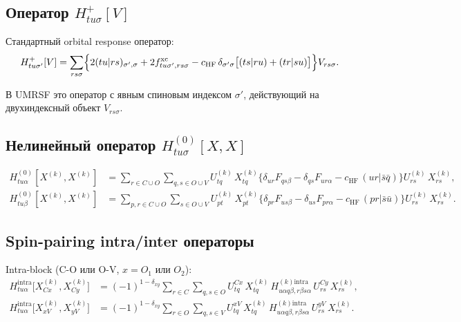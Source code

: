 \documentclass[11pt, a4paper]{article}
\theoremstyle{definition}
\newcommand{\Uk}[2]{U^{(#1)}_{#2}}
\newcommand{\Xk}[2]{X^{(#1)}_{#2}}
\newcommand{\Hp}{H^{+}}
\newcommand{\Hintra}{H^{\text{intra}}}
\newcommand{\Hkintra}{H^{(k)\text{intra}}}
\newcommand{\HF}{\text{HF}}
\newcommand{\xc}{\text{xc}}
\begin{document}
\subsection{Оператор $H^+_{tu\sigma}[V]$}

Стандартный orbital response оператор:
\begin{equation}
    \Hp_{tu\sigma'}[V] = \sum_{rs\sigma}\Bigl\{ 2(tu|rs)_{\sigma', \sigma} + 2 f^{\xc}_{tu\sigma', rs\sigma} - c_{\HF}\, \delta_{\sigma'\sigma}\bigl[(ts|ru) + (tr|su)\bigr] \Bigr\} V_{rs\sigma}.
    \label{eq:Hplus}
\end{equation}

В UMRSF это оператор с явным спиновым индексом $\sigma'$, действующий на двухиндексный объект $V_{rs\sigma}$.

\subsection{Нелинейный оператор $H^{(0)}_{tu\sigma}[X, X]$}

\begin{align}
    H^{(0)}_{tu\alpha}[\Xk{k}{}, \Xk{k}{}] &= \sum_{r \in C \cup O} \sum_{q, s \in O \cup V} \Uk{k}{tq}\, \Xk{k}{tq} \bigl\{ \delta_{ur} F_{qs\beta} - \delta_{qs} F_{ur\alpha} - c_{\HF}\, (ur|\bar s\bar q) \bigr\} \Uk{k}{rs}\, \Xk{k}{rs}, \label{eq:H0alpha} \\
    H^{(0)}_{tu\beta}[\Xk{k}{}, \Xk{k}{}] &= \sum_{p, r \in C \cup O} \sum_{s \in O \cup V} \Uk{k}{pt}\, \Xk{k}{pt} \bigl\{ \delta_{pr} F_{us\beta} - \delta_{us} F_{pr\alpha} - c_{\HF}\, (pr|\bar s\bar u) \bigr\} \Uk{k}{rs}\, \Xk{k}{rs}. \label{eq:H0beta}
\end{align}

\subsection{Spin-pairing intra/inter операторы}

Intra-block (C-O или O-V, $x = O_1$ или $O_2$):
\begin{align}
    \Hintra_{tu\alpha}\bigl[\Xk{k}{Cx}, \Xk{k}{Cy}\bigr] &= (-1)^{1 - \delta_{xy}} \sum_{r \in C} \sum_{q, s \in O} U^{Cx}_{tq}\, \Xk{k}{tq}\, \Hkintra_{u\alpha q\beta, r\beta s\alpha}\, U^{Cy}_{rs}\, \Xk{k}{rs}, \\
    \Hintra_{tu\alpha}\bigl[\Xk{k}{xV}, \Xk{k}{yV}\bigr] &= (-1)^{1 - \delta_{xy}} \sum_{r \in O} \sum_{q, s \in V} U^{xV}_{tq}\, \Xk{k}{tq}\, \Hkintra_{u\alpha q\beta, r\beta s\alpha}\, U^{yV}_{rs}\, \Xk{k}{rs}.
\end{align}
\end{document}
